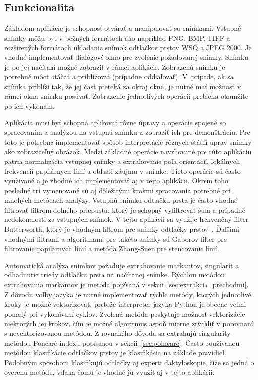  \subsection{Funkcionalita}
  Základom aplikácie je schopnosť otvárať a manipulovať so snímkami. Vstupné snímky môžu byť v bežných formátoch ako napríklad PNG, BMP, TIFF a rozšírených
  formátoch ukladania snímok odtlačkov prstov WSQ a JPEG 2000. Je vhodné implementovať dialógové okno pre zvolenie požadovanej snímky.
  Snímku je po jej načítaní možné zobraziť v rámci aplikácie. Zobrazenú snímku je potrebné môct otáčať a približovať (prípadne oddiaľovať). V~prípade, ak
  sa snímka priblíži tak, že jej časť preteká za okraj okna, je nutné mať možnosť v rámci okna snímku posúvať. Zobrazenie jednotlivých operácií prebieha
  okamžite po ich vykonaní.

  Aplikácia musí byť schopná aplikovať rôzne úpravy a operácie spojené so spracovaním a analýzou na vstupnú snímku a zobraziť ich pre demonštráciu.
  Pre toto je potrebné implementovať spôsob interpretácie rôznych štádií úprav snímky ako zobraziteľný obrázok. Medzi základné operácie navrhované pre túto
  aplikáciu patria normalizácia vstupnej snímky a extrahovanie poľa orientácií, lokálnych frekvencií papilárnych línií a oblasti záujmu v snímke. Tieto
  operácie sú často využívané a je vhodné ich implementovať aj v tejto aplikácii. Okrem toho posledné tri vymenované sú aj dôležitými krokmi spracovania
  potrebné pri mnohých metódach analýzy. Vstupnú snímku odtlačku prsta je často vhodné filtrovať filtrom dolného priepustu, ktorý je schopný vyfiltrovať šum
  a prípadné nedokonalosti zo vstupných snímok. V tejto aplikácii sa využije frekvenčný filter Butterworth, ktorý je vhodným filtrom pre snímky odtlačky
  prstov~{\cite{Drahansky}}. Ďalšími vhodnými filtrami a algoritmami pre takéto snímky sú Gaborov filter pre filtrovanie papilárnych línií a
  metóda Zhang-Suen pre stenčovanie línií.

  Automatická analýza snímkov požaduje extrahovanie markantov, singularít a odhadnutie triedy odtlačku prsta na načítanej snímke. Rýchlou metódou extrahovania
  markantov je metóda popísaná v sekcii~{\ref{sec:extrakcia_prechodmi}}. Z dôvodu voľby jazyka je nutné implementovať rýchle metódy, ktorých jednotlivé kroky
  je možné vektorizovať, pretože interpreter jazyka Python je obecne veľmi pomalý pri vykonávaní cyklov. Zvolená metóda poskytuje možnosť vektorizácie
  niektorých jej krokov, čím je možné algoritmus aspoň mierne zrýchliť v porovnaní s nevektorizovanou metódou. Z rovnakého dôvodu sa extrahujú singularity
  metódou Poncaré indexu popísanou v sekcii~{\ref{sec:poincare}}. Často používanou metódou klasifikácie odtlačkov prstov je klasifikácia na základe pravidiel.
  Podobným spôsobom klasifikujú odtlačky aj experti daktyloskopie, čiže sa jedná o overenú metódu, vďaka čomu je vhodné ju využiť aj v tejto aplikácii.

